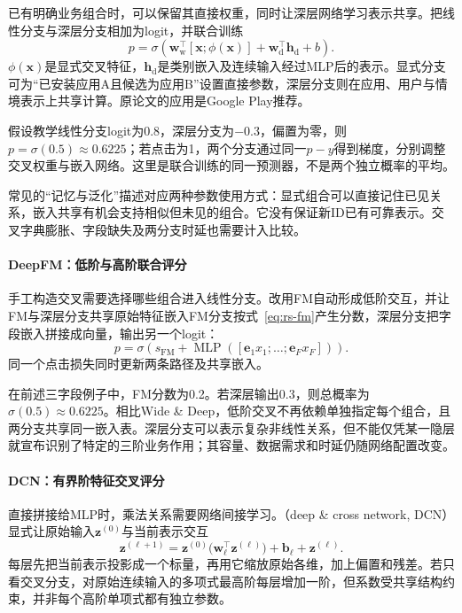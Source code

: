 已有明确业务组合时，可以保留其直接权重，同时让深层网络学习表示共享。把线性分支与深层分支相加为logit，并联合训练
\begin{equation}
 p=\sigma\!\left(\bm w_{\mathrm w}^{\top}
       [\bm x;\phi(\bm x)]
       +\bm w_{\mathrm d}^{\top}\bm h_{\mathrm d}+b\right).
 \label{eq:rs-wide-deep}
\end{equation}
$\phi(\bm x)$是显式交叉特征，$\bm h_{\mathrm d}$是类别嵌入及连续输入经过MLP后的表示。显式分支可为“已安装应用A且候选为应用B”设置直接参数，深层分支则在应用、用户与情境表示上共享计算。原论文的应用是Google Play推荐。

假设教学线性分支logit为0.8，深层分支为$-0.3$，偏置为零，则$p=\sigma(0.5)\approx0.6225$；若点击为1，两个分支通过同一$p-y$得到梯度，分别调整交叉权重与嵌入网络。这里是联合训练的同一预测器，不是两个独立概率的平均。

常见的“记忆与泛化”描述对应两种参数使用方式：显式组合可以直接记住已见关系，嵌入共享有机会支持相似但未见的组合。它没有保证新ID已有可靠表示。交叉字典膨胀、字段缺失及两分支时延也需要计入比较。

\paragraph{DeepFM：低阶与高阶联合评分}
\label{sec:rs-deepfm}

手工构造交叉需要选择哪些组合进入线性分支。改用FM自动形成低阶交互，并让FM与深层分支共享原始特征嵌入FM分支按式~\eqref{eq:rs-fm}产生分数，深层分支把字段嵌入拼接成向量，输出另一个logit：
\[
 p=\sigma\!\left(s_{\mathrm{FM}}+
       \operatorname{MLP}([\bm e_1x_1;\ldots;\bm e_Fx_F])\right).
\]
同一个点击损失同时更新两条路径及共享嵌入。

在前述三字段例子中，FM分数为0.2。若深层输出0.3，则总概率为$\sigma(0.5)\approx0.6225$。相比Wide \& Deep，低阶交叉不再依赖单独指定每个组合，且两分支共享同一嵌入表。深层分支可以表示复杂非线性关系，但不能仅凭某一隐层就宣布识别了特定的三阶业务作用；其容量、数据需求和时延仍随网络配置改变。

\paragraph{DCN：有界阶特征交叉评分}
\label{sec:rs-dcn}

直接拼接给MLP时，乘法关系需要网络间接学习。（deep \& cross network, DCN）显式让原始输入$\bm z^{(0)}$与当前表示交互
\begin{equation}
 \bm z^{(\ell+1)}
 =\bm z^{(0)}\bigl(\bm w_\ell^\top\bm z^{(\ell)}\bigr)
   +\bm b_\ell+\bm z^{(\ell)}.
 \label{eq:rs-dcn}
\end{equation}
每层先把当前表示投影成一个标量，再用它缩放原始各维，加上偏置和残差。若只看交叉分支，对原始连续输入的多项式最高阶每层增加一阶，但系数受共享结构约束，并非每个高阶单项式都有独立参数。


